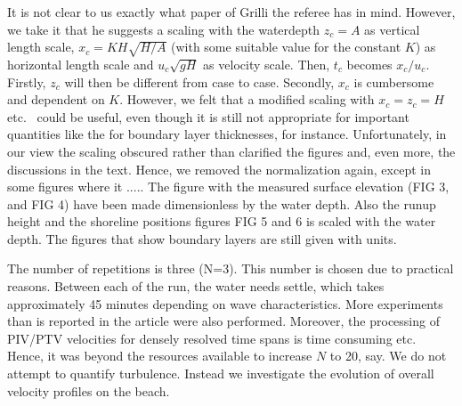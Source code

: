 \documentclass[11pt]{article}
\begin{document}

It is not clear to us exactly what paper of Grilli the referee has in mind. However, we take it that he suggests a scaling
with the waterdepth $z_c = A$ as vertical length scale, $x_c=KH\sqrt{H/A}$ (with some suitable value for the constant $K$)
as horizontal length scale and $u_c\sqrt{gH}$ as velocity scale. Then, $t_c$ becomes $x_c/u_c$. Firstly, $z_c$ will then be different from 
case to case. Secondly, $x_c$ is cumbersome and dependent on $K$. However, we felt that a  modified scaling with $x_c=z_c=H$ etc.~
could be useful, even though it is still not  appropriate for important quantities like the  for boundary layer thicknesses, for instance. Unfortunately, in our view the scaling obscured rather than clarified the figures and, even more, the discussions in the text. Hence, we removed the normalization again, except in some figures where it  .....
The figure with the measured surface elevation (FIG 3, and  FIG 4) have been  made dimensionless  by the water depth. Also the runup height and the shoreline positions figures FIG 5 and 6 is scaled with the water depth. The figures that show boundary layers are still given with units. 

The number of repetitions is three (N=3). This number is chosen due to practical reasons. Between each of the run, the water needs settle, which takes approximately 45 minutes depending on wave characteristics. More experiments than is reported in the article were also performed. Moreover, the processing of PIV/PTV velocities for densely resolved time spans is time consuming etc. Hence, it was beyond the resources available to increase $N$ to 20, say.  
We do not attempt to quantify turbulence. Instead we investigate the evolution of overall velocity profiles on the beach.

\end{document}

